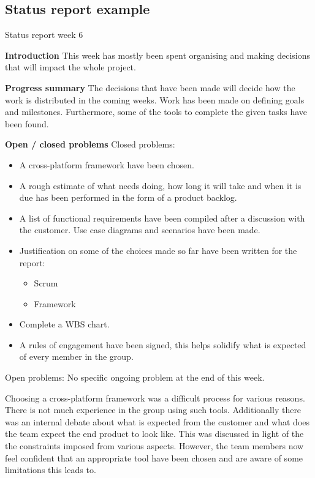 \subsection{Status report example}
Status report week 6\newline


		\textbf{Introduction} \newline
		This week has mostly been spent organising and making decisions that will impact the whole project.\newline
		
		\textbf{Progress summary} \newline
		The decisions that have been made will decide how the work is distributed in the coming weeks. Work has been made on defining goals and milestones. Furthermore, some of the tools to complete the given tasks have been found.\newline
		
		\textbf{Open / closed problems}\newline
		Closed problems:
		\begin{itemize}
			\item A cross-platform framework have been chosen.
			\item A rough estimate of what needs doing, how long it will take and when it is due has been performed in the form of a product backlog.
			\item A list of functional requirements have been compiled after a discussion with the customer.
			Use case diagrams and scenarios have been made.
			\item Justification on some of the choices made so far have been written for the report:
			\begin{itemize}
				\item Scrum
				\item Framework
			\end{itemize}
			\item Complete a WBS chart.
			\item A rules of engagement have been signed, this helps solidify what is expected of every member in the group.\newline
		\end{itemize}
		
		Open problems:\newline
		No specific ongoing problem at the end of this week.\newline
		
		Choosing a cross-platform framework was a difficult process for various reasons. There is not much experience in the group using such tools. Additionally there was an internal debate about what is expected from the customer and what does the team expect the end product to look like. This was discussed in light of the the constraints imposed from various aspects. However, the team members now feel confident that an appropriate tool have been chosen and are aware of some limitations this leads to.\newline
		
